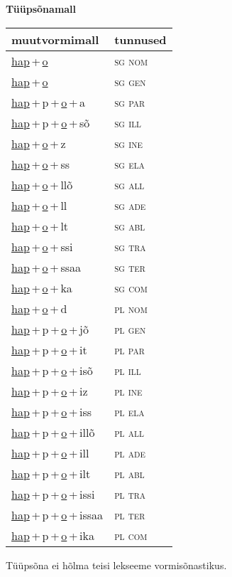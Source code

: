 
\vspace{1.8em}
\begin{minipage}{\textwidth}
\textbf{Tüüpsõnamall \,}\\

\begin{sideways}
\begin{tabular}{l l}
muutvormimall & tunnused \\
\hline
\underline{hap}\,+\,\underline{o} & \textsc{ sg nom } \\
\underline{hap}\,+\,\underline{o} & \textsc{ sg gen } \\
\underline{hap}\,+\,p\,+\,\underline{o}\,+\,a & \textsc{ sg par } \\
\underline{hap}\,+\,p\,+\,\underline{o}\,+\,sõ & \textsc{ sg ill } \\
\underline{hap}\,+\,\underline{o}\,+\,z & \textsc{ sg ine } \\
\underline{hap}\,+\,\underline{o}\,+\,ss & \textsc{ sg ela } \\
\underline{hap}\,+\,\underline{o}\,+\,llõ & \textsc{ sg all } \\
\underline{hap}\,+\,\underline{o}\,+\,ll & \textsc{ sg ade } \\
\underline{hap}\,+\,\underline{o}\,+\,lt & \textsc{ sg abl } \\
\underline{hap}\,+\,\underline{o}\,+\,ssi & \textsc{ sg tra } \\
\underline{hap}\,+\,\underline{o}\,+\,ssaa & \textsc{ sg ter } \\
\underline{hap}\,+\,\underline{o}\,+\,ka & \textsc{ sg com } \\
\underline{hap}\,+\,\underline{o}\,+\,d & \textsc{ pl nom } \\
\underline{hap}\,+\,p\,+\,\underline{o}\,+\,jõ & \textsc{ pl gen } \\
\underline{hap}\,+\,p\,+\,\underline{o}\,+\,it & \textsc{ pl par } \\
\underline{hap}\,+\,p\,+\,\underline{o}\,+\,isõ & \textsc{ pl ill } \\
\underline{hap}\,+\,p\,+\,\underline{o}\,+\,iz & \textsc{ pl ine } \\
\underline{hap}\,+\,p\,+\,\underline{o}\,+\,iss & \textsc{ pl ela } \\
\underline{hap}\,+\,p\,+\,\underline{o}\,+\,illõ & \textsc{ pl all } \\
\underline{hap}\,+\,p\,+\,\underline{o}\,+\,ill & \textsc{ pl ade } \\
\underline{hap}\,+\,p\,+\,\underline{o}\,+\,ilt & \textsc{ pl abl } \\
\underline{hap}\,+\,p\,+\,\underline{o}\,+\,issi & \textsc{ pl tra } \\
\underline{hap}\,+\,p\,+\,\underline{o}\,+\,issaa & \textsc{ pl ter } \\
\underline{hap}\,+\,p\,+\,\underline{o}\,+\,ika & \textsc{ pl com } \\
\end{tabular}
\end{sideways}
\label{tab:tüüpsõnamall-hapo}

\end{minipage}

 
\vspace{1em}
\noindent Tüüpsõna ei hõlma teisi lekseeme vormi\-sõnastikus.
